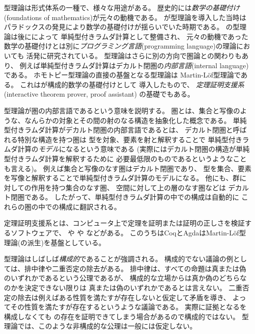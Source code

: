 \documentclass[index]{subfiles}
\begin{document}

型理論は形式体系の一種で、様々な用途がある。
歴史的には\emph{数学の基礎付け}(foundations of mathematics)が元々の動機である。
が型理論を導入した当時は
パラドックスの発見により数学の基礎付けが揺らいでいた時期である。
の型理論は後にによって
単純型付きラムダ計算として整備され、
元々の動機であった数学の基礎付けとは別に\emph{プログラミング言語}(programming language)の理論においても
活発に研究されている。
型理論はさらに別の方向で圏論との関わりもあり、
例えば単純型付きラムダ計算はデカルト閉圏の\emph{内部言語}(internal language)
である。
ホモトピー型理論の直接の基盤となる型理論は
Martin-Löf型理論である。
これはが構成的数学の基礎付けとして
導入したもので、
\emph{定理証明支援系}(interactive theorem prover, proof assistant)
の基礎でもある。

型理論が圏の内部言語であるという意味を説明する。
圏とは、集合と写像のような、なんらかの対象とその間の射のなる構造を抽象化した概念である。
単純型付きラムダ計算がデカルト閉圏の内部言語であるとは、
デカルト閉圏と呼ばれる特別な構造を持つ圏は
型を対象、要素を射と解釈することで
単純型付きラムダ計算の\emph{モデル}になるという意味である
(実際にはデカルト閉圏の構造が単純型付きラムダ計算を解釈するために
必要最低限のものであるというようなことも言える)。
例えば集合と写像のなす圏はデカルト閉圏であり、
型を集合、要素を写像と解釈することで単純型付きラムダ計算のモデルになる。
他にも、群に対しての作用を持つ集合のなす圏、
空間に対して上の層のなす圏などは
デカルト閉圏である。
したがって、単純型付きラムダ計算の中での構成は自動的に
これらの圏の中での構成に翻訳される。

定理証明支援系とは、コンピュータ上で定理を証明または証明の正しさを検証するソフトウェアで、
や
や
などがある。
このうちはCoqとAgdaはMartin-Löf型理論(の派生)を基盤としている。

型理論はしばしば\emph{構成的}であることが強調される。
構成的でない議論の例としては、排中律や二重否定の除去がある。
排中律は、すべての命題は真または偽のいずれかであるという公理であるが、
構成的な立場からは真か偽のどちらなのかを決定できない限りは
真または偽のいずれかであるとは言えない。
二重否定の除去は例えばある性質を満たすが存在しないと仮定して矛盾を導き、
よってその性質を満たすが存在するというような議論である。
実際に証拠となるを構成しなくても
の存在を証明できてしまう場合があるので構成的ではない。
型理論では、このような非構成的な公理は一般には仮定しない。
\end{document}
